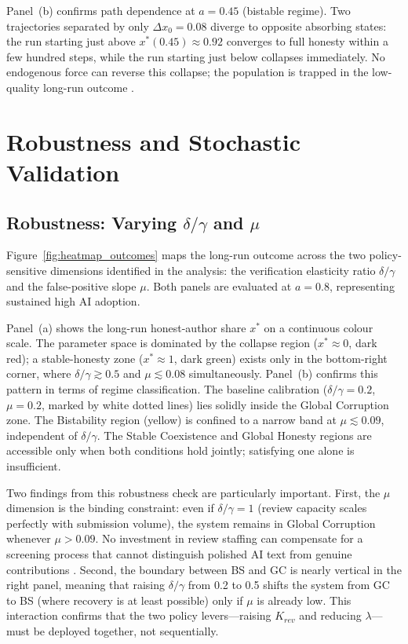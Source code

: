 \documentclass{article}
\begin{document}
Panel~(b) confirms path dependence at $a = 0.45$ (bistable regime).
Two trajectories separated by only $\Delta x_0 = 0.08$ diverge to opposite absorbing states: the run starting just above $x^*(0.45) \approx 0.92$ converges to full honesty within a few hundred steps, while the run starting just below collapses immediately.
No endogenous force can reverse this collapse; the population is trapped in the low-quality long-run outcome \citep{Schelling1978, Scheffer2001}.



\section{Robustness and Stochastic Validation}
\label{app:robustness}

\subsection{Robustness: Varying $\delta/\gamma$ and $\mu$}

Figure~\ref{fig:heatmap_outcomes} maps the long-run outcome across the two policy-sensitive dimensions identified in the analysis: the verification elasticity ratio $\delta/\gamma$ and the false-positive slope $\mu$.
Both panels are evaluated at $a = 0.8$, representing sustained high AI adoption.

Panel~(a) shows the long-run honest-author share $x^*$ on a continuous colour scale.
The parameter space is dominated by the collapse region ($x^* \approx 0$, dark red); a stable-honesty zone ($x^* \approx 1$, dark green) exists only in the bottom-right corner, where $\delta/\gamma \gtrsim 0.5$ and $\mu \lesssim 0.08$ simultaneously.
Panel~(b) confirms this pattern in terms of regime classification.
The baseline calibration ($\delta/\gamma = 0.2$, $\mu = 0.2$, marked by white dotted lines) lies solidly inside the Global Corruption zone.
The Bistability region (yellow) is confined to a narrow band at $\mu \lesssim 0.09$, independent of $\delta/\gamma$.
The Stable Coexistence and Global Honesty regions are accessible only when both conditions hold jointly; satisfying one alone is insufficient.

Two findings from this robustness check are particularly important.
First, the $\mu$ dimension is the binding constraint: even if $\delta/\gamma = 1$ (review capacity scales perfectly with submission volume), the system remains in Global Corruption whenever $\mu > 0.09$.
No investment in review staffing can compensate for a screening process that cannot distinguish polished AI text from genuine contributions \citep{Checco2021, Liang2023detectors}.
Second, the boundary between BS and GC is nearly vertical in the right panel, meaning that raising $\delta/\gamma$ from 0.2 to 0.5 shifts the system from GC to BS (where recovery is at least possible) only if $\mu$ is already low.
This interaction confirms that the two policy levers---raising $K_{rev}$ and reducing $\lambda$---must be deployed together, not sequentially.
\end{document}
